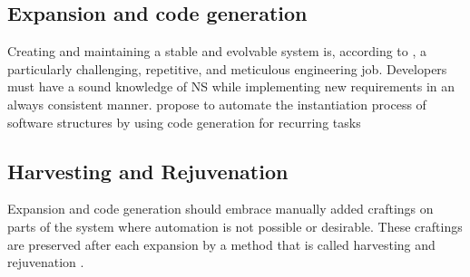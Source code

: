 \subsection{Expansion and code generation} \label{subsec_expansion}

Creating and maintaining a stable and evolvable system is, according to
\textcite[403]{mannaert_normalized_2016}, a particularly challenging, repetitive, and
meticulous engineering job. Developers must have a sound knowledge of NS while
implementing new requirements in an always consistent manner.
\textcite[403]{mannaert_normalized_2016} propose to automate the instantiation process of
software structures by using code generation for recurring tasks

\subsection{Harvesting and Rejuvenation}
Expansion and code generation should embrace manually added craftings on parts of the
system where automation is not possible or desirable. These craftings are preserved after
each expansion by a method that is called harvesting and rejuvenation
\parencite[405-406]{mannaert_normalized_2016}.